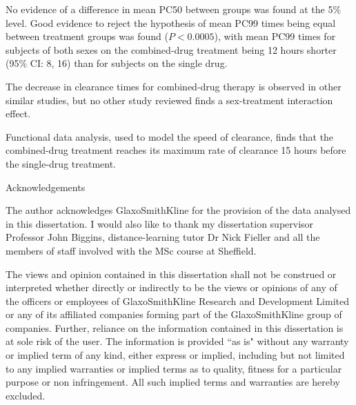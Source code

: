 \documentclass[a4paper,12pt,openright,twoside]{book}
\begin{document}
No evidence of a difference in mean PC50 between groups was found at the 5\% level. Good evidence to reject the hypothesis of mean PC99 times being equal between treatment groups was found ($P<0.0005$), with mean PC99 times for subjects of both sexes on the combined-drug treatment being 12 hours shorter (95\% CI: 8, 16) than for subjects on the single drug.

The decrease in clearance times for combined-drug therapy is observed in other similar studies, but no other study reviewed finds a sex-treatment interaction effect.

Functional data analysis, used to model the speed of clearance, finds that the combined-drug treatment reaches its maximum rate of clearance 15 hours before the single-drug treatment.
\pagebreak
\begin{center}
{\large Acknowledgements}\\[1cm]
\end{center}
The author acknowledges GlaxoSmithKline for the provision of the data analysed in this dissertation.
I would also like to thank my dissertation supervisor Professor John Biggins, distance-learning tutor Dr Nick Fieller and all the members of staff involved with the MSc course at Sheffield. 

\pagebreak
\vspace*{\fill}
{\large The views and opinion contained in this dissertation shall not be construed or interpreted whether directly or indirectly to be the views or opinions of any of the officers or employees of GlaxoSmithKline Research and Development Limited or any of its affiliated companies forming part of the GlaxoSmithKline group of companies. Further, reliance on the information contained in this dissertation is at sole risk of the user. The information is provided ``as is" without any warranty or implied term of any kind, either express or implied, including but not limited to any implied warranties or implied terms as to quality, fitness for a particular purpose or non infringement. All such implied terms and warranties are hereby excluded.}
\vspace*{\fill}
\tableofcontents

\mainmatter
\setlength{\parindent}{0.0in}
\setlength{\parskip}{0.1in}







\addappheadtotoc
\appendix
\appendixpage


\backmatter

\renewcommand{\bibname}{References}
{\singlespace}
\end{document}

